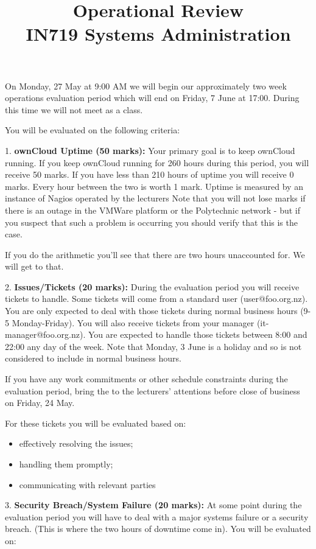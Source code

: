 \documentclass{article}   	%
\title{Operational Review\\ IN719 Systems Administration}
\date{}							%
\begin{document}
\maketitle


On Monday, 27 May at 9:00 AM we will begin our approximately two week operations evaluation period which will end on Friday, 7 June at 17:00.  During this time we will not meet as a class.

You will be evaluated on the following criteria:

1.  \textbf{ownCloud Uptime (50 marks):}  Your primary goal is to keep ownCloud running.  If you keep ownCloud running for 260 hours during this period, you will receive 50 marks.  If you have less than 210 hours of uptime you will receive 0 marks.  Every hour between the two is worth 1 mark.  Uptime is measured by an instance of Nagios operated by the lecturers  Note that you will not lose marks if there is an outage in the VMWare platform or the Polytechnic network - but if you suspect that such a problem is occurring you should verify that this is the case.

If you do the arithmetic you'll see that there are two hours unaccounted for.  We will get to that.

2.  \textbf{Issues/Tickets (20 marks):}  During the evaluation period you will receive tickets to handle.  Some tickets will come from a standard user (user@foo.org.nz).  You are only expected to deal with those tickets during normal business hours (9-5 Monday-Friday).  You will also receive tickets from your manager (it-manager@foo.org.nz).  You are expected to handle those tickets between 8:00 and 22:00 any day of the week.  Note that Monday, 3 June is a holiday and so is not considered to include in normal business hours.

If you have any work commitments or other schedule constraints during the evaluation period, bring the to the lecturers' attentions before close of business on Friday, 24 May.

For these tickets you will be evaluated based on:
 
 \begin{itemize}
   \item effectively resolving the issues;
   \item handling them promptly;
   \item communicating with relevant parties
 \end{itemize}
 
3.  \textbf{Security Breach/System Failure (20 marks):}  At some point during the evaluation period you will have to deal with a major systems failure or a security breach.  (This is where the two hours of downtime come in).  You will be evaluated on:
\end{document}
